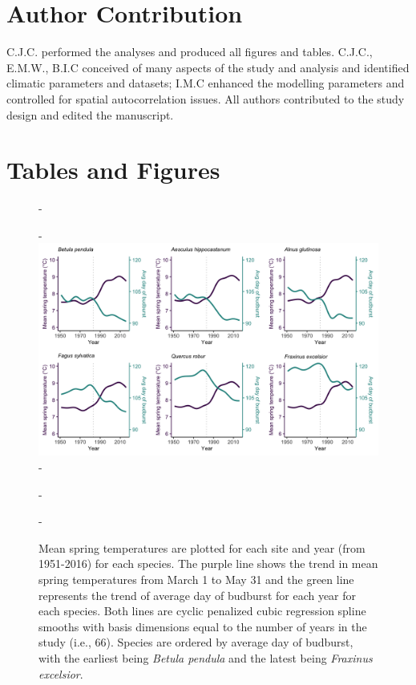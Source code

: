 \documentclass{article}\usepackage[]{graphicx}\usepackage[]{color}
\begin{document}
\section*{Author Contribution}
C.J.C. performed the analyses and produced all figures and tables. C.J.C., E.M.W., B.I.C conceived of many aspects of the study and analysis and identified climatic parameters and datasets; I.M.C enhanced the modelling parameters and controlled for spatial autocorrelation issues. All authors contributed to the study design and edited the manuscript.



\section*{Tables and Figures} 

{\begin{figure} [H]
  -\begin{center}
  -\includegraphics[width=16cm]{..//analyses/figures/MSTBB_bySpp_lines.png}
  -\caption{Mean spring temperatures are plotted for each site and year (from 1951-2016) for each species. The purple line shows the trend in mean spring temperatures from March 1 to May 31 and the green line represents the trend of average day of budburst for each year for each species. Both lines are cyclic penalized cubic regression spline smooths with basis dimensions equal to the number of years in the study (i.e., 66). Species are ordered by average day of budburst, with the earliest being \textit{Betula pendula} and the latest being \textit{Fraxinus excelsior}. }\label{fig:mst}
  -\end{center}
  -\end{figure}}
\end{document}
